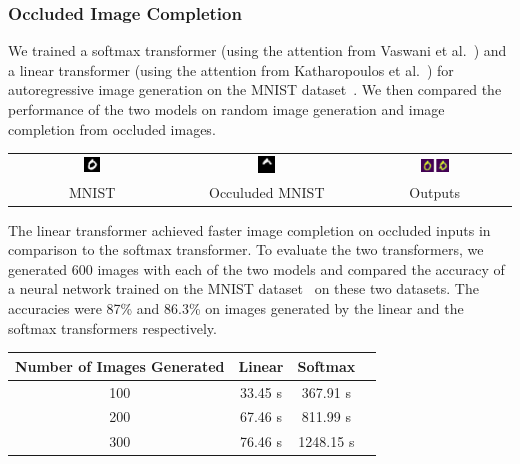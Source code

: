 \documentclass{article}
\newcommand\Tstrut{\rule{0pt}{2.6ex}}
\begin{document}
\subsubsection{Occluded Image Completion}
We trained a softmax transformer (using the attention from Vaswani et al.~\cite{vaswaniAttention}) and a linear transformer (using the attention from Katharopoulos et al.~\cite{transformersRNN}) for autoregressive image generation on the MNIST dataset~\cite{lecun2010mnist}. We then compared the performance of the two models on random image generation and image completion from occluded images.
\begin{center}
    \begin{tabular}{c c c }
        \includegraphics[width=0.1\textwidth]{images/input0.png} & \includegraphics[width=0.1\textwidth]{images/occuluded0.png} & \includegraphics[width=0.2\textwidth]{images/result0.png} \\
		MNIST & Occuluded MNIST & Outputs
    \end{tabular}
\end{center}
    The linear transformer achieved faster image completion on occluded inputs in comparison to the softmax transformer. To evaluate the two transformers, we generated 600 images with each of the two models and compared the accuracy of a neural network trained on the MNIST dataset~\cite{lecun2010mnist} on these two datasets. The accuracies were 87\% and 86.3\% on images generated by the linear and the softmax transformers respectively.
\begin{center}
    \begin{tabular}{c|c|c|c}
        Number of Images Generated & Linear & Softmax \\
        \hline
         100 & 33.45 s & 367.91 s \Tstrut\\
         200 & 67.46 s & 811.99 s\\
         300 & 76.46 s & 1248.15 s
    \end{tabular}
\end{center}
\end{document}
